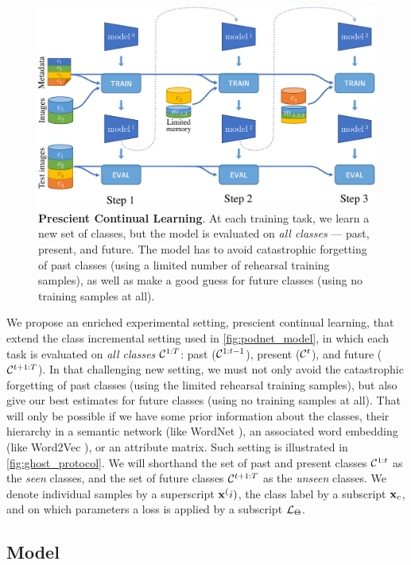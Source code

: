 \begin{figure}
    \centering
    \includegraphics[width=0.7\linewidth]{images/ghost/protocol.pdf}
    \caption{\textbf{Prescient Continual Learning}. At each training task, we learn a new set of
        classes, but the model is evaluated on \textit{all classes} --- past, present, and future.
        The model has to avoid catastrophic forgetting of past classes (using a limited number of
        rehearsal training samples), as well as make a good guess for future classes (using no
        training samples at all).}
    \label{fig:ghost_protocol}
\end{figure}


We propose an enriched experimental setting, prescient continual learning, that extend the class
incremental setting used in \autoref{fig:podnet_model}, in which each task is evaluated on
\textit{all classes} $\mathcal{C}^{1:T}$: past ($\mathcal{C}^{1:t-1}$), present ($\mathcal{C}^t$), and future
($\mathcal{C}^{t+1:T}$). In that challenging new setting, we must not only avoid the catastrophic
forgetting of past classes (using the limited rehearsal training samples), but also give our best
estimates for future classes (using no training samples at all). That will only be possible if we
have some prior information about the classes, \eg their hierarchy in a semantic network (like
WordNet \citep{fellbaum1998wordnet}), an associated word embedding (like Word2Vec
\citep{mikolov2013word2vec}), or an attribute matrix. Such setting is illustrated in
\autoref{fig:ghost_protocol}. We will shorthand the set of past and present classes $\mathcal{C}^{1:t}$ as
the \textit{seen} classes, and the set of future classes $\mathcal{C}^{t+1:T}$ as the \textit{unseen}
classes. We denote individual samples by a superscript $\mathbf{x}^(i)$, the class label by a subscript
$\mathbf{x}_c$, and on which parameters a loss is applied by a subscript $\mathcal{L}_\Theta$.

\subsection{Model}
\label{sec:ghost_model}

